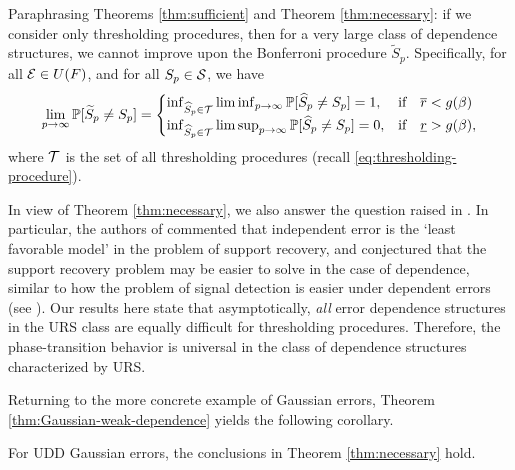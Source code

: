 \begin{remark} \label{rmk:dependence-assumptions}
Paraphrasing Theorems \ref{thm:sufficient} and Theorem \ref{thm:necessary}: 
if we consider only thresholding procedures, then for a very large class of dependence structures, we cannot improve upon the Bonferroni procedure $\widetilde{S}_p$. 
Specifically, for all ${\cal E}\in U(F)$, and for all $S_p\in {\cal S}$, we have
\begin{equation}
    \lim_{p\to\infty} \P[\widetilde{S}_p\neq S_p]
    = \begin{cases}
    \inf_{\widehat{S}_p \in {\cal T}} \liminf_{p\to\infty} \P[\widehat{S}_p\neq S_p] = 1, & \text{if}\quad \overline{r} < g(\beta)\\
    \inf_{\widehat{S}_p \in {\cal T}} \limsup_{p\to\infty} \P[\widehat{S}_p\neq S_p] = 0, & \text{if}\quad \underline{r} > g(\beta),\\
    \end{cases}
\end{equation}
where $\cal T$ is the set of all thresholding procedures (recall \eqref{eq:thresholding-procedure}). 

In view of Theorem \ref{thm:necessary}, we also answer the question raised in \citet{butucea2018variable}.
In particular, the authors of \citep{butucea2018variable} commented that independent error is the  `least favorable model' in the problem of support recovery, and conjectured that the support recovery problem may be easier to solve in the case of dependence, similar to how the problem of signal detection is easier under dependent errors (see \citep{hall2010innovated}).
Our results here state that asymptotically, \emph{all} error dependence structures in the URS class are equally difficult for thresholding procedures. 
Therefore, the phase-transition behavior is universal in the class of dependence structures characterized by URS.
\end{remark}

Returning to the more concrete example of Gaussian errors, Theorem \ref{thm:Gaussian-weak-dependence} yields the following corollary.

\begin{corollary} \label{cor:weakly-dependent-errors}
For UDD Gaussian errors, the conclusions in Theorem \ref{thm:necessary} hold.
\end{corollary}

